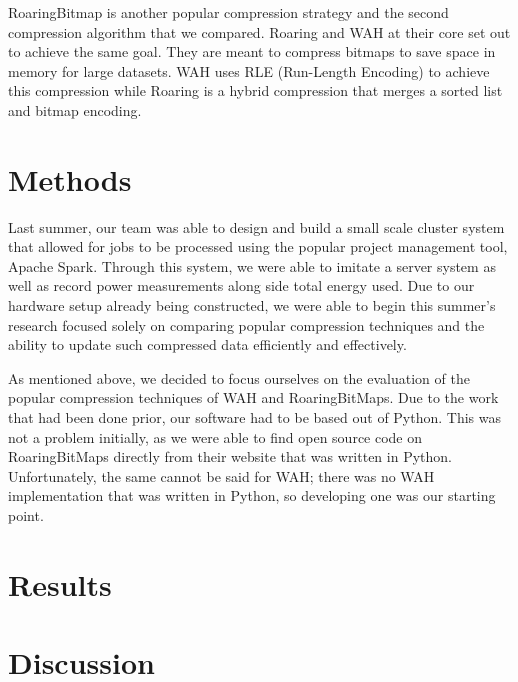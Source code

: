 \documentclass{article}
\begin{document}


RoaringBitmap is another popular compression strategy and the second compression algorithm that we compared. Roaring and WAH at their core set out to achieve the same goal. They are meant to compress bitmaps to save space in memory for large datasets. WAH uses RLE (Run-Length Encoding) to achieve this compression while Roaring is a hybrid compression that merges a sorted list and bitmap encoding. \par

%
%
\section{Methods}
Last summer, our team was able to design and build a small scale cluster system that allowed for jobs to be processed using the popular project management tool, Apache Spark. Through this system, we were able to imitate a server system as well as record power measurements along side total energy used. Due to our hardware setup already being constructed, we were able to begin this summer's research focused solely on comparing popular compression techniques and the ability to update such compressed data efficiently and effectively. \par 
As mentioned above, we decided to focus ourselves on the evaluation of the popular compression techniques of WAH and RoaringBitMaps. Due to the work that had been done prior, our software had to be based out of Python. This was not a problem initially, as we were able to find open source code on RoaringBitMaps directly from their website that was written in Python. Unfortunately, the same cannot be said for WAH; there was no WAH implementation that was written in Python, so developing one was our starting point. \par



\justify


%
%
\section{Results}
\justify

%
%
\section{Discussion}
\justify
\end{document}

